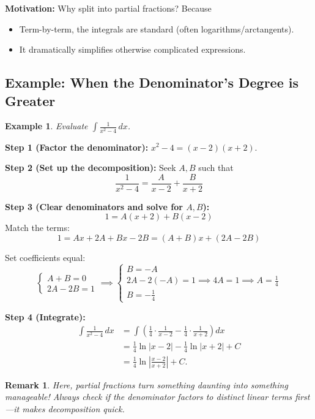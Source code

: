 \documentclass[12pt]{article}
\newtheorem{example}[definition]{Example}
\newtheorem{remark}[definition]{Remark}
\begin{document}
\vspace{0.2em}
\textbf{Motivation:} Why split into partial fractions? Because
\begin{itemize}[itemsep=0.2em]
    \item Term-by-term, the integrals are standard (often logarithms/arctangents).
    \item It dramatically simplifies otherwise complicated expressions.
\end{itemize}

\subsection{Example: When the Denominator's Degree is Greater}

\begin{example}
Evaluate \(\displaystyle \int \frac{1}{x^2 - 4}\, dx \).
\end{example}
\textbf{Step 1 (Factor the denominator):}
\(x^2 - 4 = (x - 2)(x + 2)\).

\textbf{Step 2 (Set up the decomposition):} Seek \(A, B\) such that
\[
\frac{1}{x^2 - 4} = \frac{A}{x - 2} + \frac{B}{x + 2}
\]

\textbf{Step 3 (Clear denominators and solve for $A,B$):}
\[
1 = A(x + 2) + B(x - 2)
\]
Match the terms:
\[
1 = A x + 2A + B x - 2B = (A+B)x + (2A - 2B)
\]

Set coefficients equal:
\[
\begin{cases}
A + B = 0 \\
2A - 2B = 1
\end{cases}
\implies
\begin{cases}
B = -A\\
2A - 2(-A) = 1 \implies 4A = 1 \implies A = \frac{1}{4}\\
B = -\frac{1}{4}
\end{cases}
\]

\textbf{Step 4 (Integrate):}
\begin{align*}
\int \frac{1}{x^2 - 4}\, dx &= \int \left( \frac{1}{4} \cdot \frac{1}{x-2} - \frac{1}{4} \cdot \frac{1}{x+2} \right) dx \\
&= \frac{1}{4} \ln|x-2| - \frac{1}{4} \ln|x+2| + C\\
&= \frac{1}{4} \ln\left| \frac{x-2}{x+2} \right| + C.
\end{align*}

\begin{remark}
Here, partial fractions turn something daunting into something manageable! Always check if the denominator factors to distinct linear terms first—it makes decomposition quick.
\end{remark}
\end{document}
